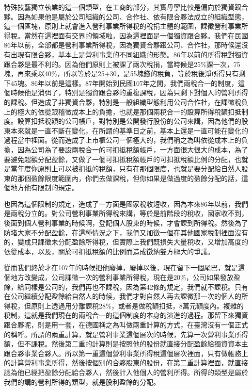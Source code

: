 \documentclass[oneside,sub3section]{ctexbook}
\begin{document}
特殊技藝獨立執業的這一個類型，在工商的部分，其實毋寧比較是偏向於獨資跟合夥。因為如果他是屬於公司組織的公司、合作社、依有限合夥法成立的組織型態，這一個區塊，原則上就會進入營利事業所得稅的稅捐主體的範圍，課徵營利事業所得稅。當然在這裡面有交界的領域啦，因為這裡面是一個獨資跟合夥。我們在民國86年以前，全部都是營利事業所得稅，因為獨資合夥跟公司、合作社，那時候還沒有出現有限合夥，基本上是營利事業的不同組織的形態。86年以前的所得稅對獨資跟合夥是最不利的。因為他們原則上被課了兩次稅捐，當時候是25\%課一次，75塊，再來乘以40\%，所以等於是25+30，是55塊錢的稅負，等於稅後淨所得只有剩下45塊。86年以前是這樣。87年開始到民國107年之間，我們兩稅合一的制度，這個時候他是消弭了，特別是獨資跟合夥的重複課稅，因為只剩下對個人的營利所得的課稅。但造成了非獨資合夥，特別是一般組織型態利用公司合作社，在課徵稅負上的極大的依從跟稽徵成本上的負擔，也就是那個兩稅合一的設算所得稅額扣抵制度。設算扣抵稅額的公司帳戶，對特別是公開發行股份的公司來講，因為他們的股東本來就是一直不斷在變化，在所謂的基準日之前，基本上還是一直可能在變化的過程當中裡面。從而造成了上市櫃公司一個極大的，我們稱之為叫依從成本上的負擔，因為公司為了要設兩稅合一的可扣抵稅額帳戶，一方面很大很大的成本，為了要避免超額分配盈餘，又做了一個可扣抵稅額帳戶的可扣抵稅額比例的分配，也就是當年度你原則上可以被扣抵的稅額，只有在那個限度，也就是要分配給自然人股東的那個盈餘限度範圍內，你們去做課稅，但你如果是做過度的盈餘分配的話，這個地方他有限制的規定。

也因為這個限制的規定，造成了一方面是國家稅收短收，因為本來86年以前，我們是兩稅分立的。對公司營利事業所得稅來講，等於是前階段的稅收，國家收不到，後面到個人營利事業的時候啊，登記個人股東的時候，才會課到所得稅。然後為了防堵大家不分配盈餘，在這種情況之下，我們又加徵一個在其他國家稅制裡面沒有的，變成只課徵未分配盈餘所得稅，但實際上我們既損失大量稅收，又增加高度的依從成本，以及，關於可扣抵稅額的比例而造成徵納雙方極大的爭議。

從而我們終於才在107年的時候把他廢掉，廢掉以後，現在留下一個尾巴，就是這個地方改變成，公司課徵一次的營利事業所得稅，現在是20\%，公司如果發放盈餘，給同樣是公司的，我們再也不課稅，因為第42條的規定，我們就不課稅。只有在公司繼續分配盈餘給自然人的時候，我們才對自然人再去課徵那一次的個人的所得稅，但原則上透過用分離課稅28\%，或者是做稅額扣抵，8萬元額度內。複雜的稅制，這就是我們現在的兩稅合一的這個制度的本身的演進的過程。那留下來獨資跟合夥呢，則是用一套，在德國稱之為叫做兩重計算的方式，在臺灣沒有一個正式的稱呼。所謂的兩重計算，就是營利事業這個層次的時候，先算一次營利事業所得額，但不課稅。然後第二重的計算則是按照他的股份就直接分配盈餘給獨資資本主跟合夥事業合夥人。所以第一重這個營利事業所得稅這個層次裡面，只有做帳務上的計算營利事業所得，然後按個別的合夥股東的股份，在第二重計算裡面，就直接認為他已經把盈餘分配給合夥人，然後計入他個人的營利所得。所得的類型是屬於我們的講的營利所得的類型，就是股利盈餘的分配。
\end{document}

